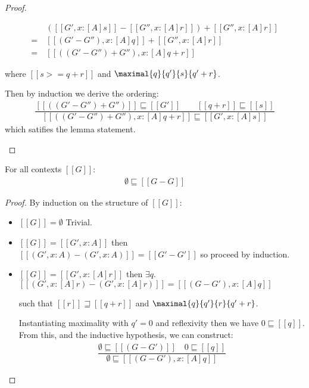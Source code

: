 \begin{proof}
\begin{enumerate}
       \begin{align*}
      & ([[G', x : [A] s ]] - [[G'', x : [A] r ]]) + [[G'', x : [A] r]] \\
    =\ & [[(G' - G''), x : [A] q ]] + [[G'', x : [A] r]] \\
    =\ & [[((G' - G'') + G''), x : [A] {q + r} ]]
       \end{align*}

     where $[[ s >= q + r ]]$ and $\maximal{q}{q'}{s}{q' + r}$.

     Then by induction we derive the ordering:
     \begin{align*}
       \dfrac{[[ ((G' - G'') + G'') ]] \sqsubseteq [[ G' ]] \qquad [[ q + r ]]  \sqsubseteq [[ s ]]}
            {[[ {((G' - G'') + G''), x : [A] {q + r}} ]] \sqsubseteq [[ {G', x : [A]s} ]]}
     \end{align*}
     which satifies the lemma statement.
 \end{enumerate}
\end{proof}

\begin{lemma}
\label{lemma:context-neg}
For all contexts $[[ G ]]$:
\begin{align*}
\emptyset \sqsubseteq [[ G - G ]]
\end{align*}
\end{lemma}

\begin{proof}
By induction on the structure of $[[ G ]]$:
%
\begin{itemize}
\item $[[ G ]] = \emptyset$ Trivial.

\item $[[ G ]] = [[ G', x : A ]]$ then
$[[ (G' , x : A) - (G', x : A) ]] = [[ G' - G' ]]$ so proceed by
induction.

\item $[[ G ]] = [[ G', x : [A] r ]]$ then
$\exists q. $
$[[ (G' , x : [A]r) - (G', x : [A]r) ]] = [[ (G - G'), x : [A]q ]]$

such that $[[ r ]] \sqsupseteq [[ q + r ]]$ and
$\maximal{q}{q'}{r}{q'+r}$.

Instantiating maximality with $q' = 0$ and reflexivity then we have
$0 \sqsubseteq [[ q ]]$. From this, and the inductive hypothesis, we can construct:
%
\begin{align*}
\dfrac{ \emptyset \sqsubseteq [[ (G - G') ]] \quad 0 \sqsubseteq [[ q ]]}
{ \emptyset \sqsubseteq [[{(G - G'), x : [A] q}  ]] }
\end{align*}
%
\end{itemize}
%
\end{proof}

